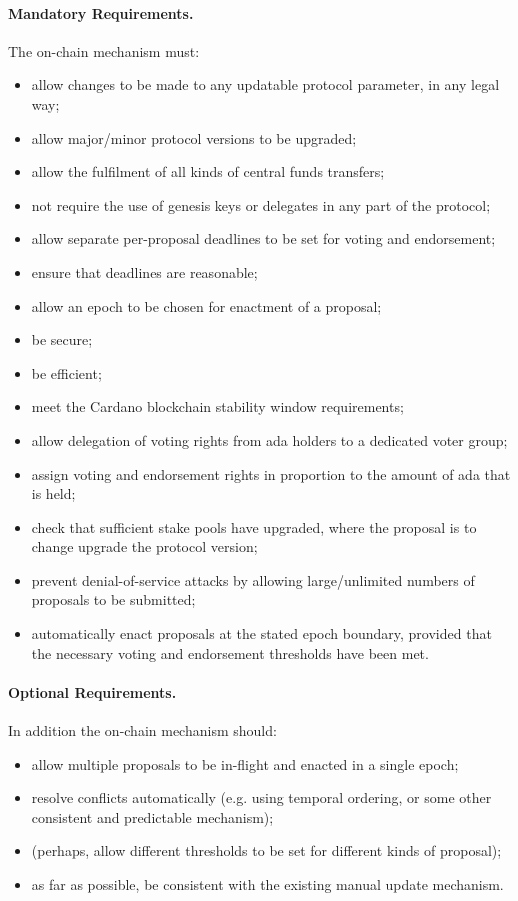 \paragraph{Mandatory Requirements.}  The on-chain mechanism must:

\begin{itemize}
\item
  allow changes to be made to any updatable protocol parameter, in any legal way;
\item
  allow major/minor protocol versions to be upgraded;
\item
  allow the fulfilment of all kinds of central funds transfers;
\item
  not require the use of genesis keys or delegates in any part of the protocol;
\item
  allow separate per-proposal deadlines to be set for voting and endorsement;
\item
  ensure that deadlines are reasonable;
\item
  allow an epoch to be chosen for enactment of a proposal;
\item
  be secure;
\item
  be efficient;
\item
  meet the Cardano blockchain stability window requirements;
\item
  allow delegation of voting rights from ada holders to a dedicated voter group;
\item
  assign voting and endorsement rights in proportion to the amount of ada that is held;
\item
  check that sufficient stake pools have upgraded, where the proposal is to change upgrade the protocol version;
\item
  prevent denial-of-service attacks by allowing large/unlimited numbers of proposals to be submitted;
\item
  automatically enact proposals at the stated epoch boundary, provided that the necessary voting and endorsement thresholds have been met.
\end{itemize}

\paragraph{Optional Requirements.}  In addition the on-chain mechanism should:

\begin{itemize}
\item
  allow multiple proposals to be in-flight and enacted in a single epoch;
\item
  resolve conflicts automatically (e.g. using temporal ordering, or some other consistent and predictable mechanism);
\item
  (perhaps, allow different thresholds to be set for different kinds of proposal);
\item
  as far as possible, be consistent with the existing manual update mechanism.
\end{itemize}
